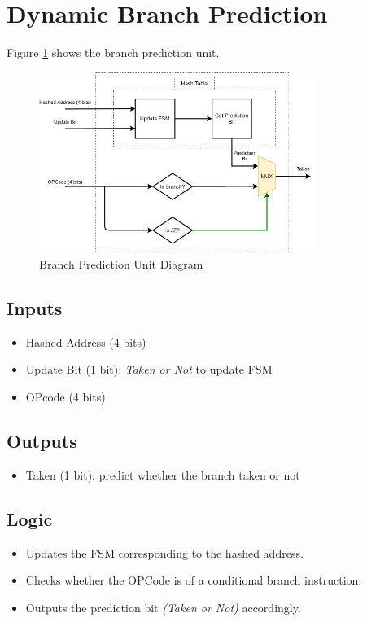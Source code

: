 \documentclass[12pt]{report}
\begin{document}
\section{Dynamic Branch Prediction}
Figure \ref{fig:bpu} shows the branch prediction unit.
\begin{center}
    \begin{figure}[hp]
        \centering
        \includegraphics[width=0.8\textwidth]{bpu}
        \caption{Branch Prediction Unit Diagram}
        \label{fig:bpu}
    \end{figure}
\end{center}

\subsection{Inputs}
\begin{itemize}
    \item Hashed Address (4 bits)
    \item Update Bit (1 bit): \emph{Taken or Not}  to update FSM
    \item OPcode (4 bits)
\end{itemize}

\subsection{Outputs}
\begin{itemize}
    \item Taken (1 bit): predict whether the branch taken or not
\end{itemize}

\subsection{Logic}
\begin{itemize}
    \item Updates the FSM corresponding to the hashed address.
    \item Checks whether the OPCode is of a conditional branch instruction.
    \item Outputs the prediction bit \emph{(Taken or Not)} accordingly.
\end{itemize}
\end{document}

